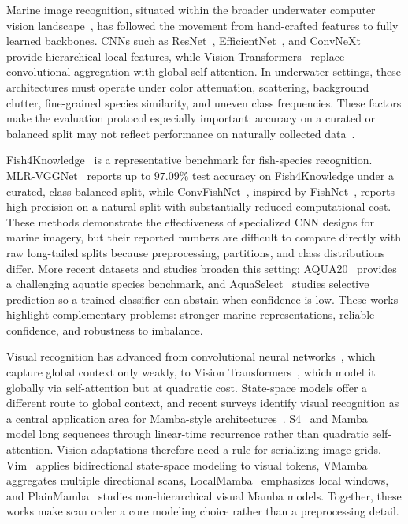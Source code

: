 \documentclass[runningheads]{llncs}
\begin{document}
Marine image recognition, situated within the broader underwater computer vision landscape~\cite{gonzalez2023underwater}, has followed the movement from hand-crafted features to fully learned backbones. CNNs such as ResNet~\cite{he2016resnet}, EfficientNet~\cite{tan2019efficientnet}, and ConvNeXt~\cite{liu2022convnext} provide hierarchical local features, while Vision Transformers~\cite{dosovitskiy2021vit} replace convolutional aggregation with global self-attention. In underwater settings, these architectures must operate under color attenuation, scattering, background clutter, fine-grained species similarity, and uneven class frequencies. These factors make the evaluation protocol especially important: accuracy on a curated or balanced split may not reflect performance on naturally collected data~\cite{gonzalez2023underwater}.

Fish4Knowledge~\cite{fish4knowledge} is a representative benchmark for fish-species recognition. MLR-VGGNet~\cite{prasetyo2021resvggnet} reports up to $97.09\%$ test accuracy on Fish4Knowledge under a curated, class-balanced split, while ConvFishNet~\cite{qu2024convfishnet}, inspired by FishNet~\cite{sun2018fishnet}, reports high precision on a natural split with substantially reduced computational cost. These methods demonstrate the effectiveness of specialized CNN designs for marine imagery, but their reported numbers are difficult to compare directly with raw long-tailed splits because preprocessing, partitions, and class distributions differ. More recent datasets and studies broaden this setting: AQUA20~\cite{fuad2026aqua20} provides a challenging aquatic species benchmark, and AquaSelect~\cite{daga2026aquaselect} studies selective prediction so a trained classifier can abstain when confidence is low. These works highlight complementary problems: stronger marine representations, reliable confidence, and robustness to imbalance.

Visual recognition has advanced from convolutional neural networks~\cite{he2016resnet, tan2019efficientnet}, which capture global context only weakly, to Vision Transformers~\cite{dosovitskiy2021vit}, which model it globally via self-attention but at quadratic cost. State-space models offer a different route to global context, and recent surveys identify visual recognition as a central application area for Mamba-style architectures~\cite{zhang2024visualmambasurvey}. S4~\cite{gu2022s4} and Mamba~\cite{gu2024mamba} model long sequences through linear-time recurrence rather than quadratic self-attention. Vision adaptations therefore need a rule for serializing image grids. Vim~\cite{zhu2024vim} applies bidirectional state-space modeling to visual tokens, VMamba~\cite{liu2024vmamba} aggregates multiple directional scans, LocalMamba~\cite{huang2024localmamba} emphasizes local windows, and PlainMamba~\cite{yang2024plainmamba} studies non-hierarchical visual Mamba models. Together, these works make scan order a core modeling choice rather than a preprocessing detail.
\end{document}
